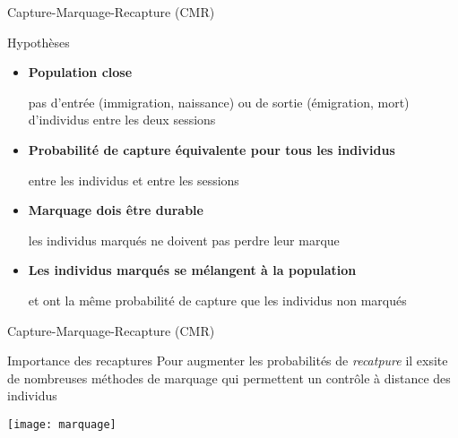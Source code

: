 \message{ !name(cours_DIE_ONIRIS_Suivi_populations_oiseaux.tex)}\documentclass[10pt]{beamer}
\begin{document}
\begin{frame}{Capture-Marquage-Recapture (CMR)}
  \begin{block}{Hypothèses}
    \begin{itemize}[<+->]
    \item \textbf{Population close}\\
      \begin{footnotesize}
        pas d'entrée (immigration, naissance) ou de sortie
        (émigration, mort) d'individus entre les deux sessions 
      \end{footnotesize}
    \item \textbf{Probabilité de capture équivalente pour tous les individus}\\
      \begin{footnotesize}
        entre les individus et entre les sessions
      \end{footnotesize}
    \item \textbf{Marquage dois être durable}\\
      \begin{footnotesize}
        les individus marqués ne doivent pas perdre leur marque
      \end{footnotesize}
    \item \textbf{Les individus marqués se mélangent à la population}\\
      \begin{footnotesize}
        et ont la même probabilité de capture que les individus non marqués
      \end{footnotesize}
    \end{itemize}
  \end{block}
\end{frame}


\begin{frame}{Capture-Marquage-Recapture (CMR)}
  \begin{block}{Importance des recaptures}
    Pour augmenter les probabilités de \emph{recatpure} il exsite de nombreuses
    méthodes de marquage qui permettent un contrôle à distance des
    individus    
  \end{block}
  \begin{center}
    \texttt{[image: marquage]}
  \end{center}
\end{frame}
\end{document}
